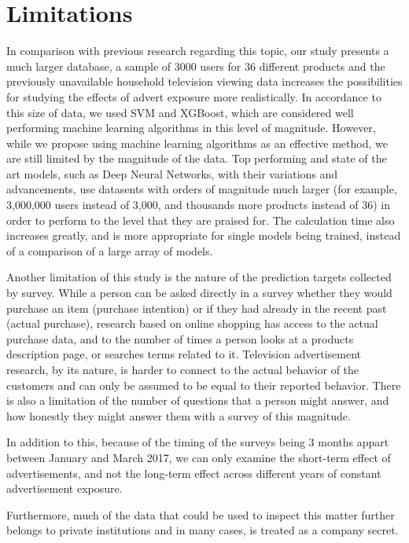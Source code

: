 \documentclass[review]{elsarticle}
\begin{document}
\section{Limitations}
\label{limitations}

In comparison with previous research regarding this topic, our study presents a much larger database, a sample of 3000 users for 36 different products and the previously unavailable household television viewing data increases the possibilities for studying the effects of advert exposure more realistically. In accordance to this size of data, we used SVM and XGBoost, which are considered well performing machine learning algorithms in this level of magnitude. However, while we propose using machine learning algorithms as an effective method, we are still limited by the magnitude of the data. Top performing and state of the art models, such as Deep Neural Networks, with their variations and advancements, use datasents with orders of magnitude much larger (for example, 3,000,000 users instead of 3,000, and thousands more products instead of 36) in order to perform to the level that they are praised for. The calculation time also increases greatly, and is more appropriate for single models being trained, instead of a comparison of a large array of models. 

Another limitation of this study is the nature of the prediction targets collected by survey. While a person can be asked directly in a survey whether they would purchase an item (purchase intention) or if they had already in the recent past (actual purchase), research based on online shopping has access to the actual purchase data, and to the number of times a person looks at a products description page, or searches terms related to it. Television advertisement research, by its nature, is harder to connect to the actual behavior of the customers and can only be assumed to be equal to their reported behavior. There is also a limitation of the number of questions that a person might answer, and how honestly they might answer them with a survey of this magnitude.

In addition to this, because of the timing of the surveys being 3 months appart between January and March 2017, we can only examine the short-term effect of advertisements, and not the long-term effect across different years of constant advertisement exposure.

Furthermore, much of the data that could be used to inspect this matter further belongs to private institutions and in many cases, is treated as a company secret. 
\end{document}
